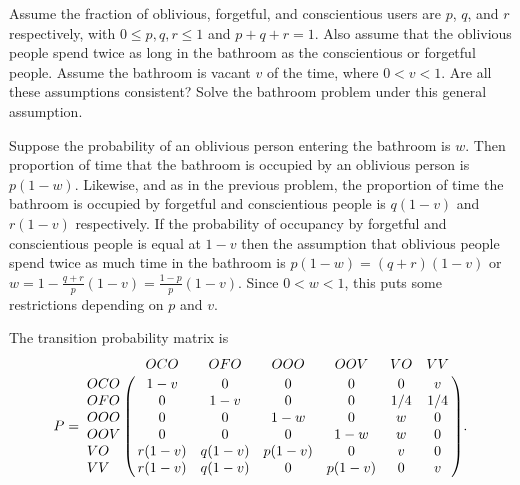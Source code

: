 \documentclass[12pt]{article}
\begin{document}
\begin{exercise}
    Assume the fraction of oblivious, forgetful, and conscientious users
    are \( p \), \( q \), and \( r \) respectively, with \( 0 \le p,q,r
    \le 1 \) and \( p + q + r = 1 \).  Also assume that the oblivious
    people spend twice as long in the bathroom as the conscientious or
    forgetful people.  Assume the bathroom is vacant \( v \) of the
    time, where \( 0 < v < 1 \).  Are all these assumptions consistent?
    Solve the bathroom problem under this general assumption.
\end{exercise}
\begin{solution}
    Suppose the probability of an oblivious person entering the bathroom
    is \( w \).  Then proportion of time that the bathroom is occupied
    by an oblivious person is \( p(1-w) \).  Likewise, and as in the
    previous problem, the proportion of time the bathroom is occupied by
    forgetful and conscientious people is \( q(1-v) \) and \( r(1-v) \)
    respectively.  If the probability of occupancy by forgetful and
    conscientious people is equal at \( 1-v \) then the assumption that
    oblivious people spend twice as much time in the bathroom is \( p(1-w)
    = (q + r)(1-v) \) or \( w = 1 - \frac{q + r}{p} (1-v) = \frac{1-p}{p}
    (1-v) \).  Since \( 0 < w < 1 \), this puts some restrictions
    depending on \( p \) and \( v \).

    The transition probability matrix is
    \[
        P= \bordermatrix{ & OCO & OFO & OOO & OOV & VO & VV \cr
        OCO & 1-v & 0 & 0 & 0 & 0 & v \cr
        OFO & 0 & 1-v & 0 & 0 & 1/4 & 1/4 \cr
        OOO & 0 & 0 & 1-w & 0 & w & 0 \cr
        OOV & 0 & 0 & 0 & 1-w & w & 0 \cr
        VO & r(1-v) & q(1-v) & p(1-v) & 0 & v & 0 \cr
        VV & r(1-v) & q(1-v) & 0 & p(1-v) & 0 & v \cr
        }.
    \]
\end{solution}
\end{document}
